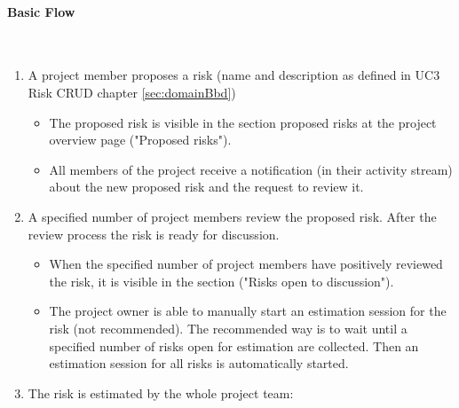 \newpage

\paragraph*{Basic Flow} \mbox{}\\

\begin{enumerate}
	\vspace{-3mm}
	\setlength\itemsep{-1em}
	
	\item A project member proposes a risk (name and description as defined in UC3 Risk CRUD chapter \ref{sec:domainBbd})
	\begin{itemize}
		\vspace{-3mm}
		\setlength\itemsep{-1em}
		
		\item The proposed risk is visible in the section proposed risks at the project overview page ("Proposed risks").
		\item All members of the project receive a notification (in their activity stream) about the new proposed risk and the request to review it.
	\end{itemize}
	
	\item A specified number of project members review the proposed risk. After the review process the risk is ready for discussion.
	\begin{itemize}
		\vspace{-3mm}
		\setlength\itemsep{-1em}
		
		\item When the specified number of project members have positively reviewed the risk, it is visible in the section ("Risks open to discussion").
		\item The project owner is able to manually start an estimation session for the risk (not recommended). The recommended way is to wait until a specified number of risks open for estimation are collected. Then an estimation session for all risks is automatically started.
	\end{itemize}
		
	\item The risk is estimated by the whole project team:
	\begin{itemize}
		\vspace{-3mm}
		\setlength\itemsep{-1em}
		

\end{itemize}
\end{enumerate}
